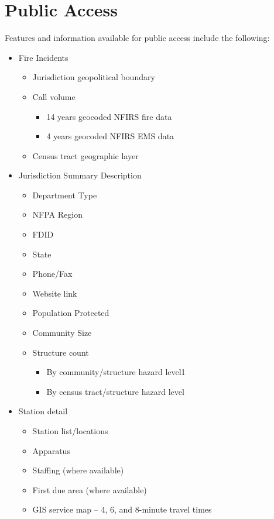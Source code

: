 \documentclass[12pt,oneside]{book}
\begin{document}
\chapter{Public Access}

Features and information available for public access include the following:

\begin{itemize}[noitemsep]
\item Fire Incidents
  \begin{itemize}[noitemsep]
  \item Jurisdiction geopolitical boundary
  \item Call volume
    \begin{itemize}[noitemsep]
    \item 14 years geocoded NFIRS fire data
    \item 4 years geocoded NFIRS EMS data
    \end{itemize}
  \item Census tract geographic layer
  \end{itemize}
\item Jurisdiction Summary Description
  \begin{itemize}[noitemsep]
  \item Department Type
  \item NFPA Region
  \item FDID
  \item State
  \item Phone/Fax
  \item Website link
  \item Population Protected
  \item Community Size
  \item Structure count
    \begin{itemize}[noitemsep]
    \item By community/structure hazard level1
    \item By census tract/structure hazard level
    \end{itemize}
  \end{itemize}
\item Station detail
  \begin{itemize}[noitemsep]
  \item Station list/locations
  \item Apparatus
  \item Staffing (where available)
  \item First due area (where available)
  \item GIS service map – 4, 6, and 8-minute travel times

\end{itemize}
\end{itemize}
\end{document}
